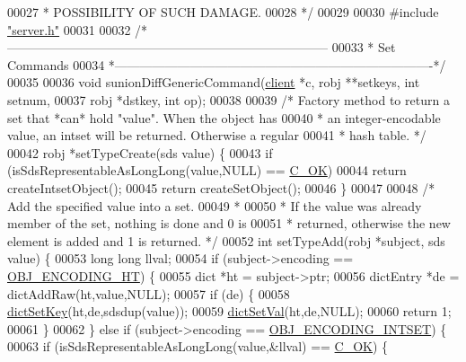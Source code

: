 \begin{DoxyCode}
00027 \textcolor{comment}{ * POSSIBILITY OF SUCH DAMAGE.}
00028 \textcolor{comment}{ */}
00029 
00030 \textcolor{preprocessor}{#}\textcolor{preprocessor}{include} \hyperlink{server_8h}{"server.h"}
00031 
00032 \textcolor{comment}{/*-----------------------------------------------------------------------------}
00033 \textcolor{comment}{ * Set Commands}
00034 \textcolor{comment}{ *----------------------------------------------------------------------------*/}
00035 
00036 \textcolor{keywordtype}{void} sunionDiffGenericCommand(\hyperlink{structclient}{client} *c, robj **setkeys, \textcolor{keywordtype}{int} setnum,
00037                               robj *dstkey, \textcolor{keywordtype}{int} op);
00038 
00039 \textcolor{comment}{/* Factory method to return a set that *can* hold "value". When the object has}
00040 \textcolor{comment}{ * an integer-encodable value, an intset will be returned. Otherwise a regular}
00041 \textcolor{comment}{ * hash table. */}
00042 robj *setTypeCreate(sds value) \{
00043     \textcolor{keywordflow}{if} (isSdsRepresentableAsLongLong(value,NULL) == \hyperlink{server_8h_a303769ef1065076e68731584e758d3e1}{C\_OK})
00044         \textcolor{keywordflow}{return} createIntsetObject();
00045     \textcolor{keywordflow}{return} createSetObject();
00046 \}
00047 
00048 \textcolor{comment}{/* Add the specified value into a set.}
00049 \textcolor{comment}{ *}
00050 \textcolor{comment}{ * If the value was already member of the set, nothing is done and 0 is}
00051 \textcolor{comment}{ * returned, otherwise the new element is added and 1 is returned. */}
00052 \textcolor{keywordtype}{int} setTypeAdd(robj *subject, sds value) \{
00053     \textcolor{keywordtype}{long} \textcolor{keywordtype}{long} llval;
00054     \textcolor{keywordflow}{if} (subject->encoding == \hyperlink{server_8h_a9c10219f68afc557d510d108257d238b}{OBJ\_ENCODING\_HT}) \{
00055         dict *ht = subject->ptr;
00056         dictEntry *de = dictAddRaw(ht,value,NULL);
00057         \textcolor{keywordflow}{if} (de) \{
00058             \hyperlink{dict_8h_a827e5dcfd37bba408fa8bdb111b0594e}{dictSetKey}(ht,de,sdsdup(value));
00059             \hyperlink{dict_8h_a95cae6581aca3a7a4c5e226e565294c9}{dictSetVal}(ht,de,NULL);
00060             \textcolor{keywordflow}{return} 1;
00061         \}
00062     \} \textcolor{keywordflow}{else} \textcolor{keywordflow}{if} (subject->encoding == \hyperlink{server_8h_a214173987de21c3b7661fddd42b05873}{OBJ\_ENCODING\_INTSET}) \{
00063         \textcolor{keywordflow}{if} (isSdsRepresentableAsLongLong(value,&llval) == \hyperlink{server_8h_a303769ef1065076e68731584e758d3e1}{C\_OK}) \{

\end{DoxyCode}
